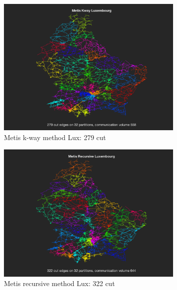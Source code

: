 \documentclass[unicode,11pt,a4paper,oneside,numbers=endperiod,openany]{scrartcl}
\begin{document}
\begin{figure}[h!]
	\centering
	\begin{subfigure}[b]{0.45\textwidth}
	\includegraphics[width=\textwidth]{images/metis_kway_lux.png}
	\caption{Metis k-way method Lux: 279 cut}
	\end{subfigure}
	\hfill
	\begin{subfigure}[b]{0.45\textwidth}
	\includegraphics[width=\textwidth]{images/metis_rec_lux.png}
	\caption{Metis recursive method Lux: 322 cut}
	\end{subfigure}
	\vfill
	\begin{subfigure}[b]{0.45\textwidth}

\end{subfigure}
\end{figure}
\end{document}
